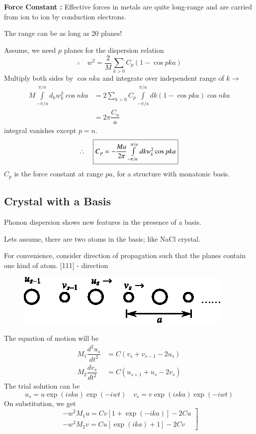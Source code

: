 \chapter[Lecture 18]{}\label{lec18}

{\bf Force Constant :} Effective forces in metals are quite long-range and are carried from ion to ion by conduction electrons.

The range can be as long as 20 planes!

Assume, we need $p$ planes for the dispersion relation
$$
\therefore\quad w^{2}=\dfrac{2}{M}\sum\limits_{k>0}C_{p}(1-\cos pka)
$$
Multiply both sides by $\cos nka$ and integrate over independent range of $k\to$
\begin{align*}
M\int\limits^{\pi/a}_{-\pi/a}d_{k}w^{2}_{k}\cos nka &= 2\sum\limits_{k>0}C_{p}\int\limits^{\pi/a}_{-\pi/a}dk(1-\cos pka)\cos nka\\
&= 2\pi \dfrac{C_{n}}{a}
\end{align*}
integral vanishes except $p=n$.
$$
\therefore\quad \fbox{$C_{p}=-\dfrac{Ma}{2\pi}\int\limits^{\pi/a}_{-\pi/a}dk w^{2}_{k}\cos pka$}
$$
$C_{p}$ is the force constant at range $pa$, for a structure with monatonic basis.

\section*{Crystal with a Basis}

Phonon dispersion shows new features in the presence of a basis.

Lets assume, there are two atoms in the basis; like NaCl crystal.

For convenience, consider direction of propagation such that the planes contain one kind of atom. [111] - direction 
\begin{figure}[H]
\centering
\includegraphics[scale=1.5]{images/lecture18/fig1.eps}
\end{figure}
The equation of motion will be
\begin{align*}
M_{1}\dfrac{d^{2}u_{s}}{dt^{2}} &= C(v_{s}+v_{s-1}-2u_{s})\\
M_{2}\dfrac{dv_{s}}{dt^{2}} &= C(u_{s+1}+u_{s}-2v_{s})
\end{align*}
The trial solution can be
$$
u_{s}=u\exp (iska) \exp (-iwt)\quad v_{s}=v\exp (iska)\exp(-iwt)
$$
On substitution, we get
\begin{equation*}
\left.
\begin{array}{l}
-w^{2}M_{1}u = Cv[1+\exp(-ika)]-2Cu\\
-w^{2}M_{2}v=Cu[\exp(ika)+1]-2Cv
\end{array}\right]\tag{A}\label{lec18-eqA}
\end{equation*}

